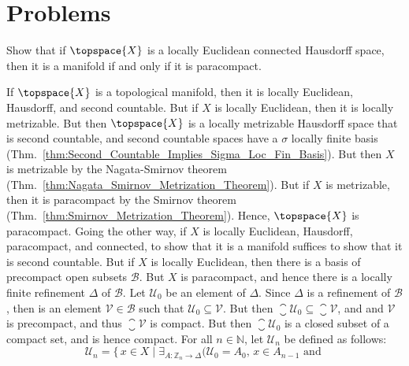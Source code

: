 \documentclass{article}                                                        %
\begin{document}
    \section{Problems}
        \begin{problem}
            Show that if $\topspace{X}$ is a locally Euclidean connected
            Hausdorff space, then it is a manifold if and only if it is
            paracompact.
        \end{problem}
        \begin{solution}
            If $\topspace{X}$ is a topological manifold, then it is locally
            Euclidean, Hausdorff, and second countable. But if $X$ is locally
            Euclidean, then it is locally metrizable. But then $\topspace{X}$ is
            a locally metrizable Hausdorff space that is second countable,
            and second countable spaces have a $\sigma$ locally finite basis
            (Thm.~\ref{thm:Second_Countable_Implies_Sigma_Loc_Fin_Basis}).
            But then $X$ is metrizable by the Nagata-Smirnov theorem
            (Thm.~\ref{thm:Nagata_Smirnov_Metrization_Theorem}). But if
            $X$ is metrizable, then it is paracompact by the
            Smirnov theorem (Thm.~\ref{thm:Smirnov_Metrization_Theorem}). Hence,
            $\topspace{X}$ is paracompact. Going the other way, if $X$ is
            locally Euclidean, Hausdorff, paracompact, and connected, to show
            that it is a manifold suffices to show that it is second countable.
            But if $X$ is locally Euclidean, then there is a basis of
            precompact open subsets $\mathcal{B}$. But $X$ is paracompact, and
            hence there is a locally finite refinement $\Delta$ of
            $\mathcal{B}$. Let $\mathcal{U}_{0}$ be an element of $\Delta$.
            Since $\Delta$ is a refinement of $\mathcal{B}$, then is an element
            $\mathcal{V}\in\mathcal{B}$ such that
            $\mathcal{U}_{0}\subseteq\mathcal{V}$. But then
            $\closure{\mathcal{U}_{0}}\subseteq\closure{\mathcal{V}}$, and
            and $\mathcal{V}$ is precompact, and thus $\closure{\mathcal{V}}$
            is compact. But then $\closure{\mathcal{U}_{0}}$ is a closed subset
            of a compact set, and is hence compact. For all $n\in\mathbb{N}$,
            let $\mathcal{U}_{n}$ be defined as follows:
            \begin{equation}
                \mathcal{U}_{n}=\Big\{\,x\in{X}\;|\;
                    \exists_{A:\mathbb{Z}_{n}\rightarrow\Delta}\big(
                        \mathcal{U}_{0}=A_{0},\,x\in{A}_{n-1}\textrm{ and }

\end{equation}
\end{solution}
\end{document}
